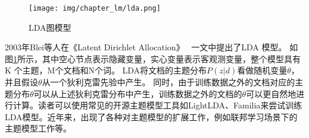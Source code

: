 \begin{figure}[htb]
	\begin{center}
		\texttt{[image: img/chapter\_lm/lda.png]}
		\caption{LDA图模型}
		\label{pic:lda}
	\end{center}
\end{figure}


2003年Blei等人在《Latent Dirichlet Allocation》~\cite{blei2003latent} 一文中提出了LDA 模型。
如图\ref{pic:lda}所示，其中空心节点表示隐藏变量，实心变量表示客观测变量，整个模型具有K 个主题，M个文档和N个词。
LDA将文档的主题分布$P(z|d)$看做随机变量$\theta$，并且假设$\theta$从一个狄利克雷先验中产生。
同时，由于训练数据之外的文档对应的主题分布$\theta$可以从上述狄利克雷分布中产生，训练数据之外的文档的$\theta$可以更自然地进行计算。读者可以使用常见的开源主题模型工具如LightLDA\cite{yuan2015lightlda}、Familia\cite{jiang2018familia}来尝试训练LDA模型。近年来，出现了各种对主题模型的扩展工作，例如联邦学习场景下的主题模型\cite{jiang2019federated}工作等。






